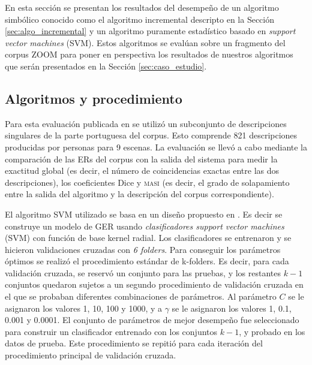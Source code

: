 En esta secci\'on se presentan los resultados del desempe\~no de un algoritmo simb\'olico conocido como el algoritmo incremental descripto en la Secci\'on \ref{sec:algo_incremental} y un algoritmo puramente estad\'istico basado en \emph{support vector machines} (SVM). Estos algoritmos se eval\'uan sobre un fragmento del corpus ZOOM para poner en perspectiva los resultados de nuestros algoritmos que ser\'an presentados en la Secci\'on \ref{sec:caso_estudio}.
\subsection{Algoritmos y procedimiento}

Para esta evaluaci\'on publicada en \cite{DBLP:conf/acl/AltamiranoFPB15} se utiliz\'o un subconjunto de descripciones singulares de la parte portuguesa del corpus. Esto comprende 821 descripciones producidas por personas para 9 escenas. La evaluaci\'on se llev\'o a cabo mediante la comparaci\'on de las ERs del corpus con la salida del sistema para medir la exactitud global (es decir, el n\'umero de coincidencias exactas entre las dos descripciones), los coeficientes Dice \cite{dice} y \textsc{masi} \cite{masi} (es decir, el grado de solapamiento entre la salida del algoritmo y la descripci\'on del corpus correspondiente).

El algoritmo SVM utilizado se basa en un dise\~no propuesto en \cite{thiago-svm}. Es decir se construye un modelo de GER usando {\it clasificadores support vector machines} (SVM) con funci\'on de base kernel radial. Los clasificadores se entrenaron y se hicieron validaciones cruzadas con {\it 6 folders}. Para conseguir los par\'ametros \'optimos se realiz\'o el procedimiento est\'andar de k-folders. Es decir, para cada validaci\'on cruzada, se reserv\'o un conjunto para las pruebas, y los restantes $k-1$ conjuntos quedaron sujetos a un segundo procedimiento de validaci\'on cruzada en el que se probaban diferentes combinaciones de par\'ametros. Al par\'ametro $C$ se le asignaron los valores 1, 10, 100 y 1000, y a $\gamma$ se le asignaron los valores 1, 0.1, 0.001 y 0.0001. El conjunto de par\'ametros de mejor desempe\~no fue seleccionado para construir un clasificador entrenado con los conjuntos $k-1$, y probado en los datos de prueba. Este procedimiento se repiti\'o para cada iteraci\'on del procedimiento principal de validaci\'on cruzada.

